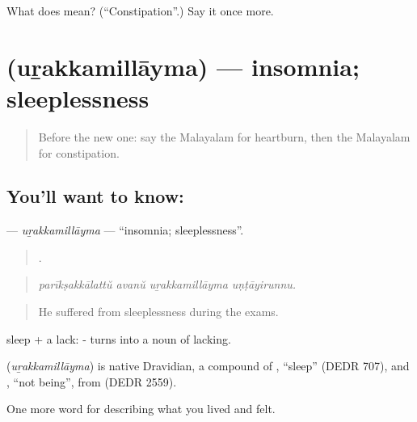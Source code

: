 \begin{tcolorbox}[breakable,colback=teal!4,colframe=teal!35!black,title={Before you move on}]
What does  mean? (\textquotedblleft{}Constipation\textquotedblright{}.) Say it once more.
\end{tcolorbox}
\section[\texorpdfstring{\ml{ഉറക്കമില്ലായ്മ} (uṟakkamillāyma)}{ഉറക്കമില്ലായ്മ (uṟakkamillāyma)}]{ (uṟakkamillāyma) — insomnia; sleeplessness}

\label{lesson:ML-C534-urakkamillayma}



\begin{quote}
Before the new one: say the Malayalam for heartburn, then the Malayalam for constipation.
\end{quote}

\subsection*{You'll want to know: }
\textbf{} — \emph{uṟakkamillāyma} — \textquotedblleft{}insomnia; sleeplessness\textquotedblright{}.

\begin{quote}
   .
\end{quote}

\begin{quote}
\emph{parīkṣakkālattŭ avanŭ uṟakkamillāyma uṇṭāyirunnu.}
\end{quote}

\begin{quote}
He suffered from sleeplessness during the exams.
\end{quote}

 sleep +  a lack: - turns  into a noun of lacking.

\begin{cousinweb}
\textbf{} (\emph{uṟakkamillāyma}) is native Dravidian, a compound of , \textquotedblleft{}sleep\textquotedblright{} (DEDR 707), and , \textquotedblleft{}not being\textquotedblright{}, from  (DEDR 2559).
\end{cousinweb}

\begin{grammarlens}[title={What you've built}]
One more word for describing what you lived and felt.
\end{grammarlens}

